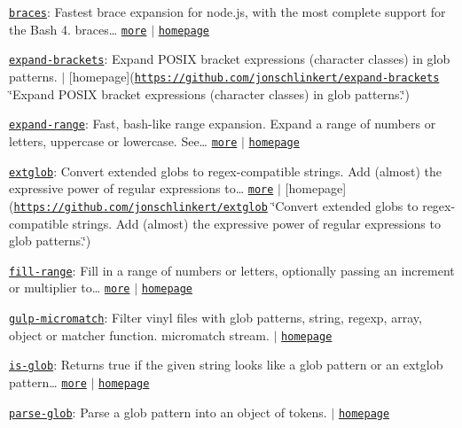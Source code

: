 \begin{DoxyItemize}
\item \href{https://www.npmjs.com/package/braces}{\tt braces}\+: Fastest brace expansion for node.\+js, with the most complete support for the Bash 4. braces… \href{https://github.com/jonschlinkert/braces}{\tt more} $\vert$ \href{https://github.com/jonschlinkert/braces}{\tt homepage}
\item \href{https://www.npmjs.com/package/expand-brackets}{\tt expand-\/brackets}\+: Expand P\+O\+S\+IX bracket expressions (character classes) in glob patterns. $\vert$ \mbox{[}homepage\mbox{]}(\href{https://github.com/jonschlinkert/expand-brackets}{\tt https\+://github.\+com/jonschlinkert/expand-\/brackets} \char`\"{}\+Expand P\+O\+S\+I\+X bracket expressions (character classes) in glob patterns.\char`\"{})
\item \href{https://www.npmjs.com/package/expand-range}{\tt expand-\/range}\+: Fast, bash-\/like range expansion. Expand a range of numbers or letters, uppercase or lowercase. See… \href{https://github.com/jonschlinkert/expand-range}{\tt more} $\vert$ \href{https://github.com/jonschlinkert/expand-range}{\tt homepage}
\item \href{https://www.npmjs.com/package/extglob}{\tt extglob}\+: Convert extended globs to regex-\/compatible strings. Add (almost) the expressive power of regular expressions to… \href{https://github.com/jonschlinkert/extglob}{\tt more} $\vert$ \mbox{[}homepage\mbox{]}(\href{https://github.com/jonschlinkert/extglob}{\tt https\+://github.\+com/jonschlinkert/extglob} \char`\"{}\+Convert extended globs to regex-\/compatible strings. Add (almost) the expressive power of regular expressions to glob patterns.\char`\"{})
\item \href{https://www.npmjs.com/package/fill-range}{\tt fill-\/range}\+: Fill in a range of numbers or letters, optionally passing an increment or multiplier to… \href{https://github.com/jonschlinkert/fill-range}{\tt more} $\vert$ \href{https://github.com/jonschlinkert/fill-range}{\tt homepage}
\item \href{https://www.npmjs.com/package/gulp-micromatch}{\tt gulp-\/micromatch}\+: Filter vinyl files with glob patterns, string, regexp, array, object or matcher function. micromatch stream. $\vert$ \href{https://github.com/tunnckocore/gulp-micromatch#readme}{\tt homepage}
\item \href{https://www.npmjs.com/package/is-glob}{\tt is-\/glob}\+: Returns {\ttfamily true} if the given string looks like a glob pattern or an extglob pattern… \href{https://github.com/jonschlinkert/is-glob}{\tt more} $\vert$ \href{https://github.com/jonschlinkert/is-glob}{\tt homepage}
\item \href{https://www.npmjs.com/package/parse-glob}{\tt parse-\/glob}\+: Parse a glob pattern into an object of tokens. $\vert$ \href{https://github.com/jonschlinkert/parse-glob}{\tt homepage}
\end{DoxyItemize}

